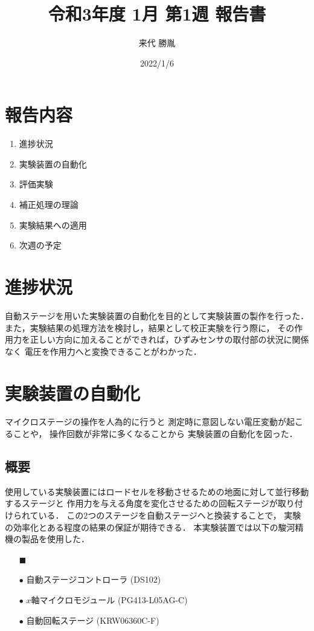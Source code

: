 \documentclass[twocolumn,a4j]{jsarticle}
\author{来代 勝胤}
\title{令和3年度 1月 第1週 報告書}
\date{2022/1/6}
\begin{document}
\columnseprule=0.1mm

\maketitle
\section*{報告内容}
\begin{enumerate}[1.]
    \item 進捗状況
    \item 実験装置の自動化
    \item 評価実験
    \item 補正処理の理論
    \item 実験結果への適用
    \item 次週の予定
\end{enumerate}

\section{進捗状況}
自動ステージを用いた実験装置の自動化を目的として実験装置の製作を行った．
また，実験結果の処理方法を検討し，結果として校正実験を行う際に，
その作用力を正しい方向に加えることができれば，ひずみセンサの取付部の状況に関係なく
電圧を作用力へと変換できることがわかった．

\section{実験装置の自動化}
マイクロステージの操作を人為的に行うと
測定時に意図しない電圧変動が起こることや，
操作回数が非常に多くなることから
実験装置の自動化を図った．\\

\subsection{概要}
使用している実験装置にはロードセルを移動させるための地面に対して並行移動するステージと
作用力を与える角度を変化させるための回転ステージが取り付けられている．
この2つのステージを自動ステージヘと換装することで，
実験の効率化とある程度の結果の保証が期待できる．
本実験装置では以下の駿河精機の製品を使用した．

\begin{itemize}
    \item [$\blacksquare$] 
    \item [$\bullet$] 自動ステージコントローラ (DS102)
    \item [$\bullet$] $x$軸マイクロモジュール (PG413-L05AG-C)
    \item [$\bullet$] 自動回転ステージ (KRW06360C-F)
\end{itemize}
\end{document}
